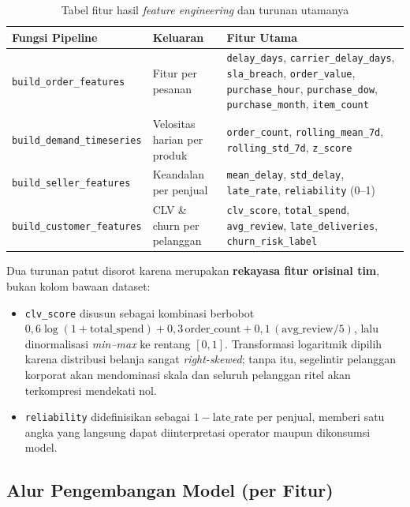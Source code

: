 \documentclass[12pt,a4paper]{article}
\begin{document}
\begin{table}[H]
  \centering\footnotesize
  \caption{Tabel fitur hasil \textit{feature engineering} dan turunan utamanya}
  \begin{tabularx}{\textwidth}{L{3.6cm} L{2.5cm} Y}
    \toprule
    \textbf{Fungsi Pipeline} & \textbf{Keluaran} & \textbf{Fitur Utama} \\
    \midrule
    \texttt{build\_order\_\-features}
      & Fitur per pesanan
      & \texttt{delay\_days}, \texttt{carrier\_delay\_days}, \texttt{sla\_breach}, \texttt{order\_value}, \texttt{purchase\_hour}, \texttt{purchase\_dow}, \texttt{purchase\_month}, \texttt{item\_count} \\[1.5pt]
    \texttt{build\_demand\_\-timeseries}
      & Velositas harian per produk
      & \texttt{order\_count}, \texttt{rolling\_mean\_7d}, \texttt{rolling\_std\_7d}, \texttt{z\_score} \\[1.5pt]
    \texttt{build\_seller\_\-features}
      & Keandalan per penjual
      & \texttt{mean\_delay}, \texttt{std\_delay}, \texttt{late\_rate}, \texttt{reliability} (0--1) \\[1.5pt]
    \texttt{build\_customer\_\-features}
      & CLV \& churn per pelanggan
      & \texttt{clv\_score}, \texttt{total\_spend}, \texttt{avg\_review}, \texttt{late\_deliveries}, \texttt{churn\_risk\_label} \\
    \bottomrule
  \end{tabularx}
\end{table}

Dua turunan patut disorot karena merupakan \textbf{rekayasa fitur orisinal tim}, bukan kolom bawaan dataset:

\begin{itemize}
  \item \texttt{clv\_score} disusun sebagai kombinasi berbobot $0{,}6\log(1+\text{total\_spend}) + 0{,}3\,\text{order\_count} + 0{,}1\,(\text{avg\_review}/5)$, lalu dinormalisasi \textit{min--max} ke rentang $[0,1]$. Transformasi logaritmik dipilih karena distribusi belanja sangat \textit{right-skewed}; tanpa itu, segelintir pelanggan korporat akan mendominasi skala dan seluruh pelanggan ritel akan terkompresi mendekati nol.
  \item \texttt{reliability} didefinisikan sebagai $1 - \text{late\_rate}$ per penjual, memberi satu angka yang langsung dapat diinterpretasi operator maupun dikonsumsi model.
\end{itemize}

\subsection{Alur Pengembangan Model (per Fitur)}
\end{document}
